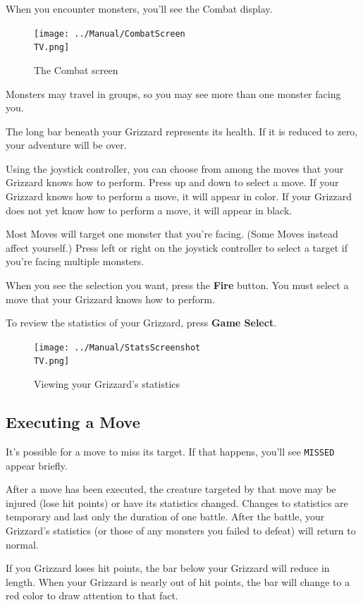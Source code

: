 \documentclass[10pt,twocolumn,openany,article]{memoir}
\newcommand\TV{NTSC}
\newcommand\TV{PAL}
\newcommand\TV{SECAM}
\begin{document}
When you encounter monsters, you'll  see the Combat display.

\begin{figure}[b]
  \texttt{[image: ../Manual/CombatScreen\\TV.png]}
  \caption{The Combat screen}
\end{figure}

Monsters may  travel in  groups, so  you may see  more than  one monster
facing you.

The  long bar  beneath your  Grizzard represents  its health.  If it  is
reduced to zero, your adventure will be over.

Using the joystick controller, you can  choose from among the moves that
your Grizzard knows how to perform. Press  up and down to select a move.
If your Grizzard knows  how to perform a move, it  will appear in color.
If your Grizzard does not yet know how to perform a move, it will appear
in black.

Most  Moves will  target one  monster  that you're  facing. (Some  Moves
instead affect yourself.) Press left or right on the joystick controller
to select a target if you're facing multiple monsters.

When you  see the selection  you want, press  the \textbf{Fire} button.  You must
select a move that your Grizzard knows how to perform.

To review the statistics of your Grizzard, press \textbf{Game Select}.

\begin{figure}[t]
  \texttt{[image: ../Manual/StatsScreenshot\\TV.png]}
  \caption{Viewing your Grizzard's statistics}
\end{figure}

\subsection{Executing a Move}

It's possible for a move to miss its target. If that happens, you'll see
\texttt{MISSED} appear briefly.

After a move  has been executed, the creature targeted  by that move may
be injured (lose hit points) or  have its statistics changed. Changes to
statistics  are temporary  and last  only  the duration  of one  battle.
After the battle,  your Grizzard's statistics (or those  of any monsters
you failed to defeat) will return to normal.

If  you Grizzard  loses hit  points, the  bar below  your Grizzard  will
reduce in  length. When your Grizzard  is nearly out of  hit points, the
bar will change to a red color to draw attention to that fact.
\end{document}
